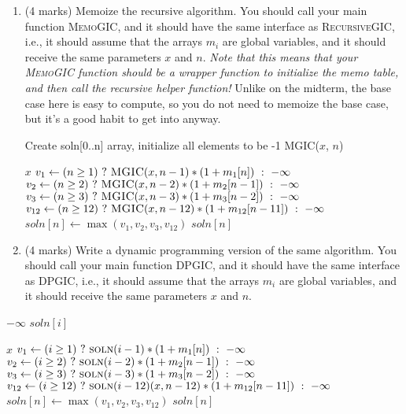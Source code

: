 \documentclass[11pt]{article}
\begin{document}
\begin{enumerate}
\item (4 marks)
Memoize the recursive algorithm.
You should call your main function \textsc{MemoGIC}, and it should
have the same interface as \textsc{RecursiveGIC}, i.e., it should
assume that the arrays $m_i$ are global
variables, and it should receive the same parameters $x$ and $n$.
\textit{Note that this means that your \textsc{MemoGIC} function
should be a wrapper function to initialize the memo table, and then
call the recursive helper function!}
Unlike on the midterm, the base case here is easy to compute, so
you do not need to memoize the base case, but it's a good habit to
get into anyway.

\begin{soln}
\begin{algorithmic}[1]
\State Create soln[0..n] array, initialize all elements to be -1
\State \Return MGIC($x$, $n$)
\EndFunction

    \State \Return $x$
\EndIf
{}
        \State $v_1 \gets (n\ge 1) \ ?\  \textsc{MGIC}(x,n-1)*(1+m_1[n])\  :\  -\infty$
        \State $v_2 \gets (n\ge 2) \ ?\  \textsc{MGIC}(x,n-2)*(1+m_2[n-1])\  :\  -\infty$
        \State $v_3 \gets (n\ge 3) \ ?\  \textsc{MGIC}(x,n-3)*(1+m_3[n-2])\  :\  -\infty$
        \State $v_{12} \gets (n\ge 12) \ ?\  \textsc{MGIC}(x,n-12)*(1+m_{12}[n-11])\  :\  -\infty$
        \State $soln[n] \gets \max(v_1,v_2,v_3,v_{12})$
\EndIf
\State \Return $soln[n]$
\EndFunction

\end{algorithmic}
\end{soln}
\newpage
\item (4 marks)
Write a dynamic programming version of the same algorithm.
You should call your main function \textsc{DPGIC}, and it should
have the same interface as \textsc{DPGIC}, i.e., it should
assume that the arrays $m_i$ are global
variables, and it should receive the same parameters $x$ and $n$.
\end{enumerate}


\begin{soln}
\begin{algorithmic}[1]
\State \Return $-\infty$
\Else
\State \Return $soln[i]$
\EndIf
\EndFunction

    \State \Return $x$
\EndIf
{}
        \State $v_1 \gets (i\ge 1) \ ?\  \textsc{soln}(i-1)*(1+m_1[n])\  :\  -\infty$
        \State $v_2 \gets (i\ge 2) \ ?\  \textsc{soln}(i-2)*(1+m_2[n-1])\  :\  -\infty$
        \State $v_3 \gets (i\ge 3) \ ?\  \textsc{soln}(i-3)*(1+m_3[n-2])\  :\  -\infty$
        \State $v_{12} \gets (i\ge 12) \ ?\  \textsc{soln}(i-12)(x,n-12)*(1+m_{12}[n-11])\  :\  -\infty$
        \State $soln[n] \gets \max(v_1,v_2,v_3,v_{12})$
\EndFor
\State \Return $soln[n]$
\EndFunction

\end{algorithmic}
\end{soln}
\clearpage
\end{document}
